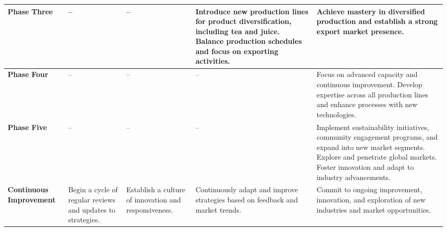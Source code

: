 \documentclass{article}
\begin{document}
\begin{longtable}{p{1.5cm}p{3cm}p{3cm}p{3cm}p{3cm}}
\textbf{Phase Three} & 
-- & 
-- & 
Introduce new production lines for product diversification, including tea and juice. Balance production schedules and focus on exporting activities. & 
Achieve mastery in diversified production and establish a strong export market presence. \\
\midrule

\textbf{Phase Four} & 
-- & 
-- & 
-- & 
Focus on advanced capacity and continuous improvement. Develop expertise across all production lines and enhance processes with new technologies. \\
\midrule

\textbf{Phase Five} & 
-- & 
-- & 
-- & 
Implement sustainability initiatives, community engagement programs, and expand into new market segments. Explore and penetrate global markets. Foster innovation and adapt to industry advancements. \\
\midrule

\textbf{Continuous Improvement} & 
Begin a cycle of regular reviews and updates to strategies. & 
Establish a culture of innovation and responsiveness. & 
Continuously adapt and improve strategies based on feedback and market trends. & 
Commit to ongoing improvement, innovation, and exploration of new industries and market opportunities. \\

\end{longtable}
\end{document}
